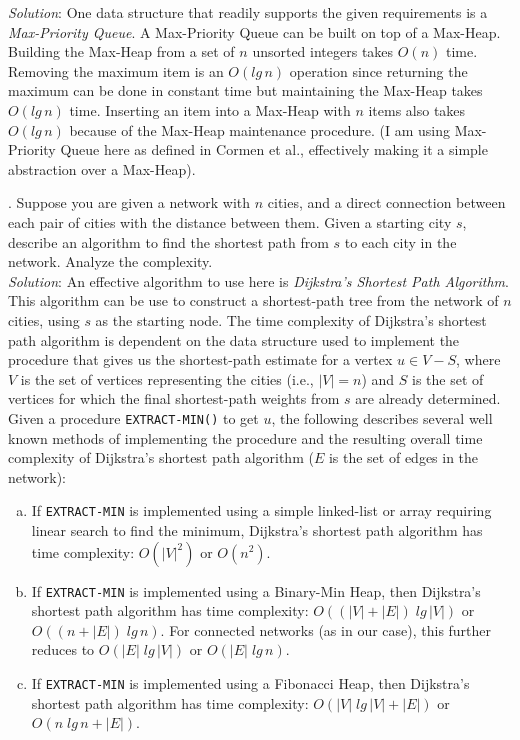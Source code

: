 \documentclass{scrartcl}
\begin{document}
    \noindent
    \textit{Solution}: One data structure that readily supports the given requirements is a
    \emph{Max-Priority Queue}. A Max-Priority Queue can be built on top of a Max-Heap. Building the
    Max-Heap from a set of $n$ unsorted integers takes $O(n)$ time. Removing the maximum item is an
    $O(lg\,n)$ operation since returning the maximum can be done in constant time but maintaining
    the Max-Heap takes $O(lg\,n)$ time. Inserting an item into a Max-Heap with $n$ items also takes
    $O(lg\,n)$ because of the Max-Heap maintenance procedure. (I am using Max-Priority Queue here as
    defined in Cormen et al., effectively making it a simple abstraction over a Max-Heap).

    \newpage
    . Suppose you are given a network with $n$ cities, and a direct connection between each pair of
    cities with the distance between them. Given a starting city $s$, describe an algorithm to find
    the shortest path from $s$ to each city in the network. Analyze the complexity.\\

    \noindent
    \textit{Solution}: An effective algorithm to use here is \emph{Dijkstra's Shortest Path
    Algorithm}. This algorithm can be use to construct a shortest-path tree from the network of $n$
    cities, using $s$ as the starting node. The time complexity of Dijkstra's shortest path
    algorithm is dependent on the data structure used to implement the procedure that gives us the
    shortest-path estimate for a vertex $u \in V - S$, where $V$ is the set of vertices representing
    the cities (i.e., $|V| = n$) and $S$ is the set of vertices for which the final shortest-path
    weights from $s$ are already determined. Given a procedure \verb|EXTRACT-MIN()| to get $u$, the
    following describes several well known methods of implementing the procedure and the resulting
    overall time complexity of Dijkstra's shortest path algorithm ($E$ is the set of edges in the
    network):
    \begin{enumerate}[(a)]
        \item If \verb|EXTRACT-MIN| is implemented using a simple linked-list or array requiring
            linear search to find the minimum, Dijkstra's shortest path algorithm has time
            complexity: $O(|V|^2)$ or $O(n^2)$.
        \item If \verb|EXTRACT-MIN| is implemented using a Binary-Min Heap, then Dijkstra's shortest
            path algorithm has time complexity: $O((|V| + |E|)\;lg\,|V|)$ or $O((n + |E|)\;lg\,n)$.
            For connected networks (as in our case), this further reduces to $O(|E|\;lg\,|V|)$ or
            $O(|E|\;lg\,n)$.
        \item If \verb|EXTRACT-MIN| is implemented using a Fibonacci Heap, then Dijkstra's shortest
            path algorithm has time complexity: $O(|V|\;lg\,|V| + |E|)$ or $O(n\;lg\,n + |E|)$.
    \end{enumerate}
\end{document}
